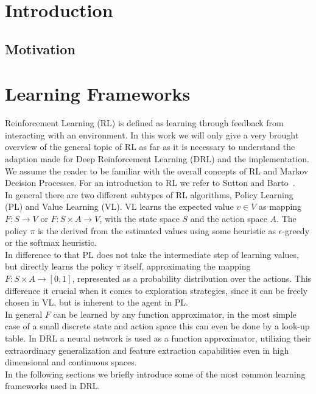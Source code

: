 \documentclass[11pt,a4paper]{article}
\begin{document}
%
	\tableofcontents
	\newpage

    \thispagestyle{fancy}


    \section{Introduction}\label{sec:introduction}
    \lipsum[1]

	\subsection{Motivation}\label{subsec:motivation}
	\lipsum[2]

	\section{Learning Frameworks}\label{sec:learning-frameworks}
	Reinforcement Learning (RL) is defined as learning through feedback from interacting with an environment.
	In this work we will only give a very brought overview of the general topic of RL as far as it is necessary to understand the adaption made for Deep Reinforcement Learning (DRL) and the implementation.
	We assume the reader to be familiar with the overall concepts of RL and Markov Decision Processes.
	For an introduction to RL we refer to Sutton and Barto~\cite{sutton_introduction_1998}.\\

	In general there are two different subtypes of RL algorithms, Policy Learning (PL) and Value Learning (VL).
	VL learns the expected value $v \in V$ as mapping $F: S \rightarrow V$ or $F: S \times A \rightarrow V$, with the state space	$S$ and the action space $A$.
	The policy $\pi$ is the derived from the estimated values using some heuristic as $\epsilon$-greedy or the softmax heuristic.\\
	In difference to that PL does not take the intermediate step of learning values, but directly learns the policy $\pi$ itself, approximating the mapping $F : S \times A \rightarrow [0, 1]$, represented as a probability distribution over the actions.
	This difference it crucial when it comes to exploration strategies, since it can be freely chosen in VL, but is inherent to the agent in PL.\\

	In general $F$ can be learned by any function approximator, in the most simple case of a small discrete state and action space this can even be done by a look-up table.
	In DRL a neural network is used as a function approximator, utilizing their extraordinary generalization and feature extraction capabilities even in high dimensional and continuous spaces.\\
	In the following sections we briefly introduce some of the most common learning frameworks used in DRL.
\end{document}
